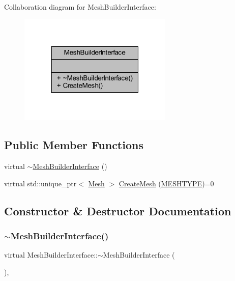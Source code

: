 Collaboration diagram for Mesh\+Builder\+Interface\+:
\nopagebreak
\begin{figure}[H]
\begin{center}
\leavevmode
\includegraphics[width=208pt]{class_mesh_builder_interface__coll__graph}
\end{center}
\end{figure}
\subsection*{Public Member Functions}
\begin{DoxyCompactItemize}
\item 
virtual \mbox{\hyperlink{class_mesh_builder_interface_a28fb0d634106aaac150e1314e7c9c876}{$\sim$\+Mesh\+Builder\+Interface}} ()
\item 
virtual std\+::unique\+\_\+ptr$<$ \mbox{\hyperlink{class_mesh}{Mesh}} $>$ \mbox{\hyperlink{class_mesh_builder_interface_a2d9b31466ef198b2029438970af81323}{Create\+Mesh}} (\mbox{\hyperlink{_abstract_factory_2_abstract_factory_2builder_2_mesh_builder_8h_ad6436347ddb93aed826a19081b53dd61}{M\+E\+S\+H\+T\+Y\+PE}})=0
\end{DoxyCompactItemize}


\subsection{Constructor \& Destructor Documentation}
\mbox{\label{class_mesh_builder_interface_a28fb0d634106aaac150e1314e7c9c876}} 
\subsubsection{\texorpdfstring{$\sim$MeshBuilderInterface()}{~MeshBuilderInterface()}}
{\footnotesize\ttfamily virtual Mesh\+Builder\+Interface\+::$\sim$\+Mesh\+Builder\+Interface (\begin{DoxyParamCaption}{ }\end{DoxyParamCaption})\hspace{0.3cm}{\ttfamily [inline]}, {\ttfamily [virtual]}}



